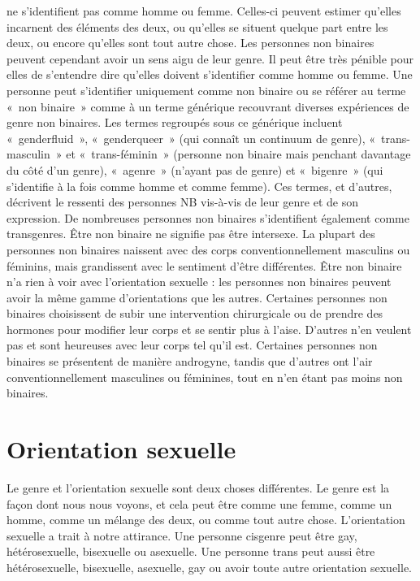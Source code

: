 \documentclass[12pt,openany]{book}
\begin{document}
\newpage
\noindent ne s’identifient pas comme homme ou femme. Celles-ci peuvent estimer qu’elles incarnent des éléments des deux, ou qu’elles se situent quelque part entre les deux, ou encore qu’elles sont tout autre chose. Les personnes non binaires peuvent cependant avoir un sens aigu de leur genre. Il peut être très pénible pour elles de s’entendre dire qu’elles doivent s’identifier comme homme ou femme. Une personne peut s’identifier uniquement comme non binaire ou se référer au terme \mbox{« n}on binair\mbox{e »} comme à un terme générique recouvrant diverses expériences de genre non binaires. Les termes regroupés sous ce générique incluent \mbox{« genderfluid »}, \mbox{« genderqueer »} (qui connaît un continuum de genre), \mbox{« t}rans-masculi\mbox{n »} et \mbox{« t}rans-fémini\mbox{n »} (personne non binaire mais penchant davantage du côté d’un genre), \mbox{« agenre »} (n’ayant pas de genre) et \mbox{« bigenre »} (qui s’identifie à la fois comme homme et comme femme). Ces termes, et d’autres, décrivent le ressenti des personnes NB vis-à-vis de leur genre et de son expression. De nombreuses personnes non binaires s’identifient également comme transgenres. Être non binaire ne signifie pas être intersexe. La plupart des personnes non binaires naissent avec des corps conventionnellement masculins ou féminins, mais grandissent avec le sentiment d’être différentes. Être non binaire n’a rien à voir avec l’orientation sexuelle : les personnes non binaires peuvent avoir la même gamme d’orientations que les autres. Certaines personnes non binaires choisissent de subir une intervention chirurgicale ou de prendre des hormones pour modifier leur corps et se sentir plus à l’aise. D’autres n’en veulent pas et sont heureuses avec leur corps tel qu’il est. Certaines personnes non binaires se présentent de manière androgyne, tandis que d’autres ont l’air conventionnellement masculines ou féminines, tout en n’en étant pas moins non binaires.

\section*{Orientation sexuelle}

\noindent Le genre et l’orientation sexuelle sont deux choses différentes. Le genre est la façon dont nous nous voyons, et cela peut être comme une femme, comme un homme, comme un mélange des deux, ou comme tout autre chose. L’orientation sexuelle a trait à notre attirance. Une personne cisgenre peut être gay, hétérosexuelle, bisexuelle ou asexuelle. Une personne trans peut aussi être hétérosexuelle, bisexuelle, asexuelle, gay ou avoir toute autre orientation sexuelle.
\end{document}
